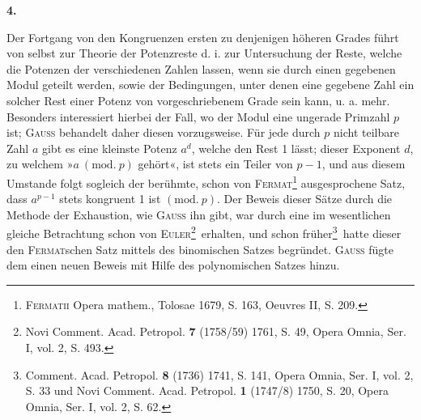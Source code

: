 \par\bigskip{}
\begin{center}\bfseries 4.\end{center}
\noindent\hspace*{\parindent}Der Fortgang von den Kongruenzen ersten zu denjenigen höheren Grades führt von selbst zur Theorie der Potenzreste d. i. zur Untersuchung der Reste, welche die Potenzen der verschiedenen Zahlen lassen, wenn sie durch einen gegebenen Modul geteilt werden, sowie der Bedingungen, unter denen eine gegebene Zahl ein solcher Rest einer Potenz von vorgeschriebenem Grade sein kann, u. a. mehr. Besonders interessiert hierbei der Fall, wo der Modul eine ungerade Primzahl \(p\) ist; \textsc{Gauss} behandelt daher  diesen vorzugsweise. Für jede durch \(p\) nicht teilbare Zahl \(a\) gibt es eine kleinste Potenz \(a^d\), welche den Rest 1 lässt; dieser Exponent \(d\), zu welchem »\(a\ (\mathrm{mod.}\ p)\) gehört«, ist stets ein Teiler von \(p-1\), und aus diesem Umstande folgt sogleich der berühmte, schon von \textsc{Fermat}\footnote{\textsc{Fermatii} Opera mathem., Tolosae 1679, S. 163, Oeuvres II, S. 209.} ausgesprochene Satz, dass \(a^{p-1}\) stets kongruent 1 ist \((\mathrm{mod.}\ p)\). Der Beweis dieser Sätze durch die Methode der Exhaustion, wie \textsc{Gauss} ihn gibt, war durch eine im wesentlichen gleiche Betrachtung schon von \textsc{Euler}\begingroup\renewcommand{\thefootnote}{**)}\footnote{Novi Comment. Acad. Petropol. \textbf{7} (1758/59) 1761, S. 49, Opera Omnia, Ser. I, vol. 2, S. 493.}\endgroup\ erhalten, und schon früher\begingroup\renewcommand{\thefootnote}{***)}\footnote{Comment. Acad. Petropol. \textbf{8} (1736) 1741, S. 141, Opera Omnia, Ser. I, vol. 2, S. 33 und Novi Comment. Acad. Petropol. \textbf{1} (1747/8) 1750, S. 20, Opera Omnia, Ser. I, vol. 2, S. 62.}\endgroup\ hatte dieser den \textsc{Fermat}schen Satz mittels des binomischen Satzes begründet. \textsc{Gauss} fügte dem einen neuen Beweis mit Hilfe des polynomischen Satzes hinzu.

